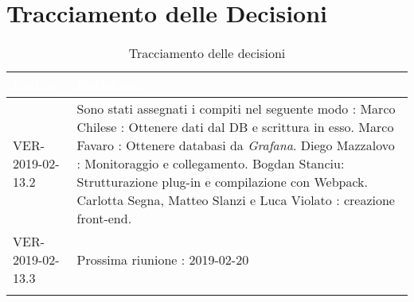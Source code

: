 
\newpage
\section{Tracciamento delle Decisioni}

\begin{longtable}{|C{.40\textwidth}|C{.60\textwidth}|}
\hline
{}\textbf{\textcolor{white}{Codice}} & \textbf{\textcolor{white}{Decisione}}\\
\hline
VER-2019-02-13.2 &  Sono stati assegnati i compiti nel seguente modo : 
Marco Chilese : Ottenere dati dal DB e scrittura in esso.
Marco Favaro : Ottenere databasi da \textit{Grafana}.
Diego Mazzalovo : Monitoraggio e collegamento.
Bogdan Stanciu: Strutturazione plug-in e compilazione con Webpack.
Carlotta Segna, Matteo Slanzi e Luca Violato : creazione front-end.\\
\hline
{} VER-2019-02-13.3 & Prossima riunione : 2019-02-20 \\
\hline

\caption{Tracciamento delle decisioni}
\end{longtable}
